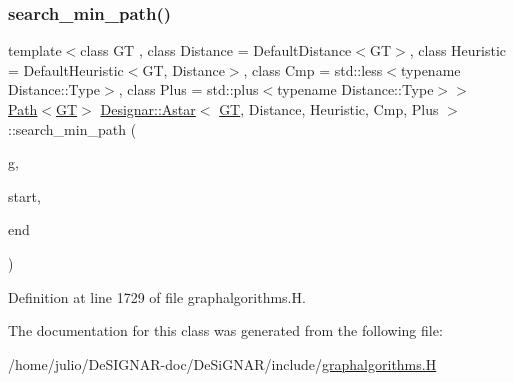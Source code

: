 \subsubsection{\texorpdfstring{search\+\_\+min\+\_\+path()}{search\_min\_path()}}
{\footnotesize\ttfamily template$<$class GT , class Distance  = Default\+Distance$<$\+G\+T$>$, class Heuristic  = Default\+Heuristic$<$\+G\+T, Distance$>$, class Cmp  = std\+::less$<$typename Distance\+::\+Type$>$, class Plus  = std\+::plus$<$typename Distance\+::\+Type$>$$>$ \\
\hyperlink{class_designar_1_1_path}{Path}$<$\hyperlink{demo-buildgraph_8_c_a3001c40d2c31ca87ed96cd7d1334a55e}{GT}$>$ \hyperlink{class_designar_1_1_astar}{Designar\+::\+Astar}$<$ \hyperlink{demo-buildgraph_8_c_a3001c40d2c31ca87ed96cd7d1334a55e}{GT}, Distance, Heuristic, Cmp, Plus $>$\+::search\+\_\+min\+\_\+path (\begin{DoxyParamCaption}\item[{\hyperlink{demo-buildgraph_8_c_a3001c40d2c31ca87ed96cd7d1334a55e}{GT} \&}]{g,  }\item[{\hyperlink{class_designar_1_1_astar_a0d4cdf6b94255824c6c93e5ae18e9eb7}{Node} \&}]{start,  }\item[{\hyperlink{class_designar_1_1_astar_a0d4cdf6b94255824c6c93e5ae18e9eb7}{Node} \&}]{end }\end{DoxyParamCaption})\hspace{0.3cm}{\ttfamily [inline]}}



Definition at line 1729 of file graphalgorithms.\+H.



The documentation for this class was generated from the following file\+:\begin{DoxyCompactItemize}
\item 
/home/julio/\+De\+S\+I\+G\+N\+A\+R-\/doc/\+De\+Si\+G\+N\+A\+R/include/\hyperlink{graphalgorithms_8_h}{graphalgorithms.\+H}\end{DoxyCompactItemize}
